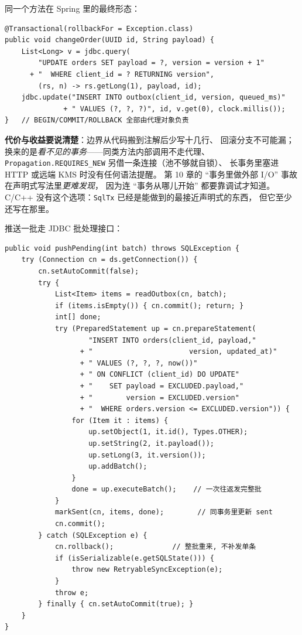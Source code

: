 \documentclass[12pt,a4paper,fontset=fandol]{ctexbook}
\newcommand{\Tp}[1]{\texttt{#1}}
\newcommand{\CppJava}{C/C++}
\begin{document}
同一个方法在 Spring 里的最终形态：

\begin{lstlisting}[style=javastyle,caption={Java：声明式事务下的同一个方法}]
@Transactional(rollbackFor = Exception.class)
public void changeOrder(UUID id, String payload) {
    List<Long> v = jdbc.query(
        "UPDATE orders SET payload = ?, version = version + 1"
      + "  WHERE client_id = ? RETURNING version",
        (rs, n) -> rs.getLong(1), payload, id);
    jdbc.update("INSERT INTO outbox(client_id, version, queued_ms)"
              + " VALUES (?, ?, ?)", id, v.get(0), clock.millis());
}   // BEGIN/COMMIT/ROLLBACK 全部由代理对象负责
\end{lstlisting}

\textbf{代价与收益要说清楚}：边界从代码搬到注解后少写十几行、
回滚分支不可能漏；换来的是\emph{看不见的事务}——同类方法内部调用不走代理、
\Tp{Propagation.\allowbreak REQUIRES\_NEW} 另借一条连接（池不够就自锁）、
长事务里塞进 HTTP 或远端 KMS 时没有任何语法提醒。
第 10 章的 ``事务里做外部 I/O'' 事故在声明式写法里\emph{更难发现}，
因为连 ``事务从哪儿开始'' 都要靠调试才知道。
\CppJava{} 没有这个选项：\Tp{SqlTx} 已经是能做到的最接近声明式的东西，
但它至少还写在那里。

推送一批走 JDBC 批处理接口：

\begin{lstlisting}[style=javastyle,caption={Java：addBatch 与 executeBatch 推送}]
public void pushPending(int batch) throws SQLException {
    try (Connection cn = ds.getConnection()) {
        cn.setAutoCommit(false);
        try {
            List<Item> items = readOutbox(cn, batch);
            if (items.isEmpty()) { cn.commit(); return; }
            int[] done;
            try (PreparedStatement up = cn.prepareStatement(
                    "INSERT INTO orders(client_id, payload,"
                  + "                       version, updated_at)"
                  + " VALUES (?, ?, ?, now())"
                  + " ON CONFLICT (client_id) DO UPDATE"
                  + "    SET payload = EXCLUDED.payload,"
                  + "        version = EXCLUDED.version"
                  + "  WHERE orders.version <= EXCLUDED.version")) {
                for (Item it : items) {
                    up.setObject(1, it.id(), Types.OTHER);
                    up.setString(2, it.payload());
                    up.setLong(3, it.version());
                    up.addBatch();
                }
                done = up.executeBatch();    // 一次往返发完整批
            }
            markSent(cn, items, done);        // 同事务里更新 sent
            cn.commit();
        } catch (SQLException e) {
            cn.rollback();              // 整批重来, 不补发单条
            if (isSerializable(e.getSQLState())) {
                throw new RetryableSyncException(e);
            }
            throw e;
        } finally { cn.setAutoCommit(true); }
    }
}
\end{lstlisting}
\end{document}
